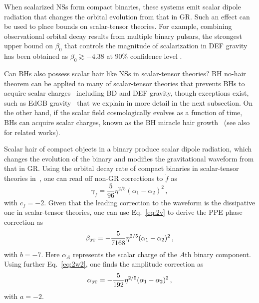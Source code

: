 \documentclass[prd,twocolumn,nofootinbib]{revtex4-1}
\newcommand\be{\begin{equation}}
\newcommand\ee{\end{equation}}
\newcommand{\ST}{{\mbox{\tiny ST}}}
\begin{document}
When scalarized NSs form compact binaries, these systems emit scalar dipole radiation that changes the orbital evolution from that in GR. Such an effect can be used to place bounds on scalar-tensor theories. For example, combining observational orbital decay results from multiple binary pulsars, the strongest upper bound on $\beta_0$ that controls the magnitude of scalarization in DEF gravity has been obtained as $\beta_0\gtrsim -4.38$ at $90\%$ confidence level \cite{Shao:2017gwu}. 

Can BHs also possess scalar hair like NSs in scalar-tensor theories? BH no-hair theorem can be applied to many of scalar-tensor theories that prevents BHs to acquire scalar charges~\cite{Hawking:1972qk,Bekenstein:1995un,Sotiriou:2011dz,Hui:2012qt,Maselli:2015yva} including BD and DEF gravity, though exceptions exist, such as EdGB gravity~\cite{Yunes:2011we,Sotiriou:2013qea,Sotiriou:2014pfa,Silva:2017uqg,Doneva:2017bvd} that we explain in more detail in the next subsection. On the other hand, if the scalar field cosmologically evolves as a function of time, BHs can acquire scalar charges, known as the BH miracle hair growth~\cite{Jacobson:1999vr,Horbatsch:2011ye} (see also~\cite{Healy:2011ef,Berti:2013gfa} for related works). 


Scalar hair of compact objects in a binary produce scalar dipole radiation, which changes the evolution of the binary and modifies the gravitational waveform from that in GR. Using the orbital decay rate of compact binaries in scalar-tensor theories in~\cite{Freire:2012mg,Wex:2014nva}, one can read off non-GR corrections to $\dot f$ as
\be
\gamma_{\dot f} = \frac{5}{96} \eta ^{2/5}(\alpha_1-\alpha_2)^2\,,
\ee
with $c_{\dot f} = -2$.
Given that the leading correction to the waveform is the dissipative one in scalar-tensor theories, one can use Eq.~\eqref{eq:2v} to derive the PPE phase correction as
\be\label{eq:betaST}
\beta_{\ST}=-\frac{5}{7168}\eta ^{2/5}(\alpha_1-\alpha_2)^2\,,
\ee
with $b=-7$. Here $\alpha_A$ represents the scalar charge of the $A$th binary component.
Using further Eq.~\eqref{eq:2w2}, one finds the amplitude correction as
\be\label{eq:alphaST}
\alpha_{\ST}=-\frac{5}{192}\eta ^{2/5}(\alpha_1-\alpha_2)^2\,,
\ee
with $a=-2$. 
\end{document}
